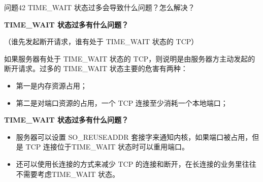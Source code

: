 \documentclass[cn,11pt,color=blue,lang=cn]{elegantbook}
\begin{document}
\begin{custom}{问题42}
TIME\_WAIT 状态过多会导致什么问题？怎么解决？
\end{custom}
\begin{solution}
\begin{note} \textbf{TIME\_WAIT 状态过多有什么问题？} \end{note}
（谁先发起断开请求，谁有处于 TIME\_WAIT 状态的 TCP）

如果服务器有处于 TIME\_WAIT 状态的 TCP，则说明是由服务器方主动发起的断开请求。过多的 TIME\_WAIT 状态主要的危害有两种：
\begin{itemize}
	\item 第一是内存资源占用；
	\item 第二是对端口资源的占用，一个 TCP 连接至少消耗一个本地端口；
\end{itemize}
\begin{note} \textbf{TIME\_WAIT 状态过多有什么问题？} \end{note}
\begin{itemize}
	\item 服务器可以设置 SO\_REUSEADDR 套接字来通知内核，如果端口被占用，但是 TCP 连接位于TIME\_WAIT 状态时可以重用端口。
	\item 还可以使用长连接的方式来减少 TCP 的连接和断开，在长连接的业务里往往不需要考虑TIME\_WAIT 状态。
\end{itemize}
\end{solution}
\end{document}
